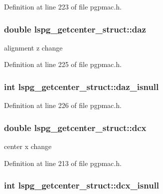 Definition at line 223 of file pgpmac.\-h.

\hypertarget{structlspg__getcenter__struct_a1170bab2161f03ab29c39f79519ed9ae}{
\subsubsection[{daz}]{\setlength{\rightskip}{0pt plus 5cm}double lspg\-\_\-getcenter\-\_\-struct\-::daz}}\label{structlspg__getcenter__struct_a1170bab2161f03ab29c39f79519ed9ae}


alignment z change 



Definition at line 225 of file pgpmac.\-h.

\hypertarget{structlspg__getcenter__struct_a36742b6bd0f4bf9356414930ba893617}{
\subsubsection[{daz\-\_\-isnull}]{\setlength{\rightskip}{0pt plus 5cm}int lspg\-\_\-getcenter\-\_\-struct\-::daz\-\_\-isnull}}\label{structlspg__getcenter__struct_a36742b6bd0f4bf9356414930ba893617}


Definition at line 226 of file pgpmac.\-h.

\hypertarget{structlspg__getcenter__struct_ade0534056296e9ed568404c538be9227}{
\subsubsection[{dcx}]{\setlength{\rightskip}{0pt plus 5cm}double lspg\-\_\-getcenter\-\_\-struct\-::dcx}}\label{structlspg__getcenter__struct_ade0534056296e9ed568404c538be9227}


center x change 



Definition at line 213 of file pgpmac.\-h.

\hypertarget{structlspg__getcenter__struct_aa404da85af654998f039c81a77626748}{
\subsubsection[{dcx\-\_\-isnull}]{\setlength{\rightskip}{0pt plus 5cm}int lspg\-\_\-getcenter\-\_\-struct\-::dcx\-\_\-isnull}}\label{structlspg__getcenter__struct_aa404da85af654998f039c81a77626748}


